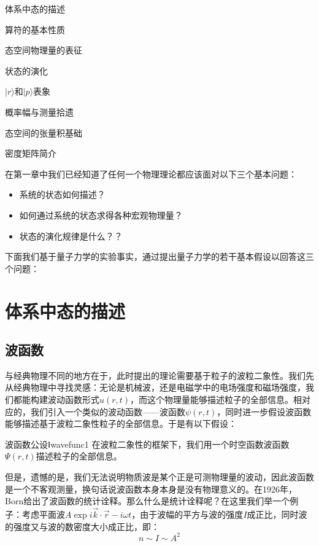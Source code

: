 \begin{introduction}
    \item 体系中态的描述
    \item 算符的基本性质
    \item 态空间物理量的表征
    \item 状态的演化
    \item $|r\rangle$和$|p\rangle$表象
    \item 概率幅与测量拾遗
    \item *态空间的张量积基础
    \item *密度矩阵简介
\end{introduction}

在第一章中我们已经知道了任何一个物理理论都应该面对以下三个基本问题：
\begin{itemize}
    \item 系统的状态如何描述？
    \item 如何通过系统的状态求得各种宏观物理量？
    \item 状态的演化规律是什么？？
\end{itemize}

下面我们基于量子力学的实验事实，通过提出量子力学的若干基本假设以回答这三个问题：
\section{体系中态的描述}
    \subsection{波函数}
    与经典物理不同的地方在于，此时提出的理论需要基于粒子的波粒二象性。我们先从经典物理中寻找灵感：无论是机械波，还是电磁学中的电场强度和磁场强度，我们都能构建波动函数形式$u(r,t)$，而这个物理量能够描述粒子的全部信息。相对应的，我们引入一个类似的波动函数——波函数$\psi(r,t)$，同时进一步假设波函数能够描述基于波粒二象性粒子的全部信息。于是有以下假设：
    \begin{definition}{波函数公设Ⅰ}{wavefunc1}
    在波粒二象性的框架下，我们用一个时空函数波函数$\Psi(r,t) $描述粒子的全部信息。
    \end{definition}
    
    但是，遗憾的是，我们无法说明物质波是某个正是可测物理量的波动，因此波函数是一个不客观测量，换句话说波函数本身本身是没有物理意义的。在1926年，Born给出了波函数的统计诠释。那么什么是统计诠释呢？在这里我们举一个例子：考虑平面波$A\exp{i\Vec{k}\cdot\Vec{r}-i\omega t}$，由于波幅的平方与波的强度$I$成正比，同时波的强度又与波的数密度大小成正比，即：
    \begin{equation}
        n\sim I\sim A^2
    \end{equation}
    
